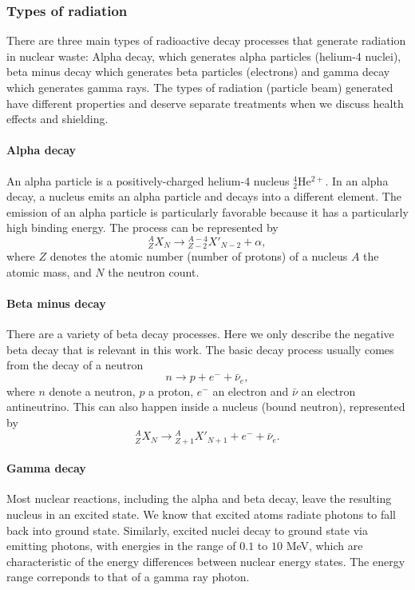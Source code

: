 \documentclass[nofootinbib,preprint,aps]{revtex4-1}
\begin{document}
        \subsubsection{Types of radiation}
        There are three main types of radioactive decay processes that generate radiation in nuclear waste: 
        Alpha decay, which generates alpha particles (helium-4 nuclei), beta minus decay which generates beta
        particles (electrons) and gamma decay which generates gamma rays.
        The types of radiation (particle beam) generated
        have different properties and deserve separate treatments when we discuss health effects and shielding.
        \paragraph{Alpha decay}
        An alpha particle is a positively-charged 
        helium-4 nucleus ${}^4_2$He$^{2+}$. In an alpha decay, a nucleus emits an alpha
        particle and decays into a different element. The emission of an alpha particle is
        particularly favorable because it has a particularly
        high binding energy. The process can be represented by
        \begin{equation}
            {}^A_Z X_N \rightarrow {}^{A-4}_{Z-2}X'_{N-2} + \alpha,
        \end{equation}
        where $Z$ denotes the atomic number (number of protons) of a nucleus $A$ the atomic mass, and $N$ the
        neutron count.

        \paragraph{Beta minus decay}
        There are a variety of beta decay processes. Here we only describe the negative beta decay that is
        relevant in this work. The basic decay process usually comes from the decay of a neutron
        \begin{equation}
            n \rightarrow p + e^- + \bar{\nu}_e,
        \end{equation}
        where $n$ denote  a neutron, $p$ a proton, $e^-$ an electron and $\bar{\nu}$ an electron antineutrino.
        This can also happen inside a nucleus (bound neutron), represented by
        \begin{equation}
            {}^A_Z X_N \rightarrow {}^A_{Z+1} X'_{N+1} + e^- + \bar{\nu}_e.
        \end{equation}

        \paragraph{Gamma decay}
        Most nuclear reactions, including the alpha and beta decay, leave the resulting nucleus in
        an excited state.
        We know that excited atoms radiate photons to fall back into ground state. Similarly, excited nuclei
        decay to ground state via emitting photons, with energies in the range
        of $0.1$ to $10$ MeV, which are characteristic of the energy differences between nuclear energy states.
        The energy range correponds to that of a gamma ray photon.
    
\end{document}
